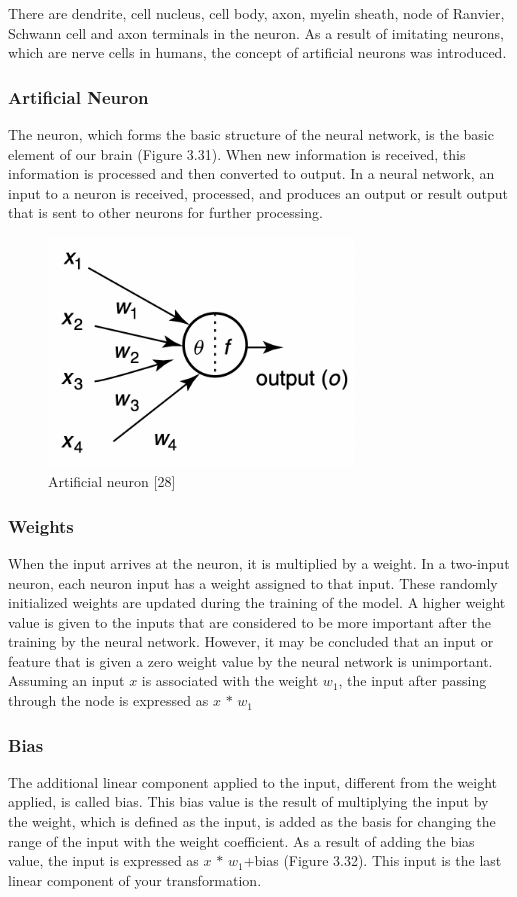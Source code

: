 \documentclass[12pt,twoside,a4]{mwbk}
\begin{document}
\noindent There are dendrite, cell nucleus, cell body, axon, myelin sheath, node of Ranvier, Schwann cell and axon terminals in the neuron. As a result of imitating neurons, which are nerve cells in humans, the concept of artificial neurons was introduced.

\subsubsection{Artificial Neuron}
The neuron, which forms the basic structure of the neural network, is the basic element of our brain (Figure 3.31). When new information is received, this information is processed and then converted to output. In a neural network, an input to a neuron is received, processed, and produces an output or result output that is sent to other neurons for further processing.
\begin{figure}[h]
    \centering
    \includegraphics[width=8.1cm, height=6.1cm]{art_neuron.png}
    \caption{Artificial neuron [28]}
\end{figure}

\subsubsection{Weights}
When the input arrives at the neuron, it is multiplied by a weight. In a two-input neuron, each neuron input has a weight assigned to that input. These randomly initialized weights are updated during the training of the model. A higher weight value is given to the inputs that are considered to be more important after the training by the neural network. However, it may be concluded that an input or feature that is given a zero weight value by the neural network is unimportant. Assuming an input \textbf{$x$} is associated with the weight $w_1$, the input after passing through the node is expressed as \textbf{$x$} $*$ $w_1$

\subsubsection{Bias}
The additional linear component applied to the input, different from the weight applied, is called bias. This bias value is the result of multiplying the input by the weight, which is defined as the input, is added as the basis for changing the range of the input with the weight coefficient. As a result of adding the bias value, the input is expressed as \textbf{$x$} $*$ $w_1$+bias (Figure 3.32). This input is the last linear component of your transformation.
\end{document}
